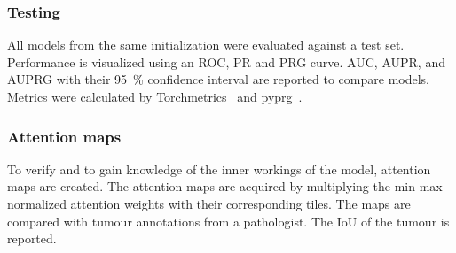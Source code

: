 \subsubsection{Testing}
All models from the same initialization were evaluated against a test set.
Performance is visualized using an ROC, PR and PRG curve.
AUC, AUPR, and AUPRG with their \qty{95}{\percent} confidence interval are reported to compare models.
Metrics were calculated by Torchmetrics~\cite{Detlefsen2022} and pyprg~\cite{Flach2015}.

\subsubsection{Attention maps}
To verify and to gain knowledge of the inner workings of the model, attention maps are created.
The attention maps are acquired by multiplying the min-max-normalized attention weights with their corresponding tiles.
The maps are compared with tumour annotations from a pathologist.
The IoU of the tumour is reported.
